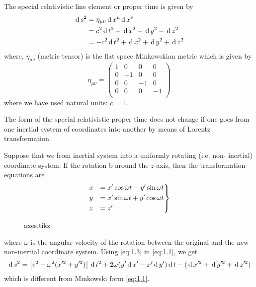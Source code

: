 \documentclass[../main-sheet.tex]{subfiles}
\begin{document}
\begin{soln}
The special relativistic line element or proper time is given by
\begin{align}
    \,\mathrm{d}\, s^2&=\eta_{\mu\nu}\,\mathrm{d}\, x^\mu\,\mathrm{d}\, x^\nu\notag\\
    &=c^2\,\mathrm{d}\, t^2-\,\mathrm{d}\, x^2-\,\mathrm{d}\, y^2-\,\mathrm{d}\, z^2\notag\\
    &=-c^2\,\mathrm{d}\, t^2+\,\mathrm{d}\, x^2+\,\mathrm{d}\, y^2+\,\mathrm{d}\, z^2\label{eq:1.1}
\end{align}
where, \(\eta_{\mu\nu}\) (metric tensor) is the flat space Minkowskian metric which is given by
\begin{equation}
    \eta_{\mu\nu}=\begin{pmatrix}
        1 & 0 & 0 & 0 \\
        0 & -1 & 0 & 0 \\
        0 & 0 & -1 & 0 \\
        0 & 0 & 0 & -1 \\
    \end{pmatrix}
    \label{eq:1.2}
\end{equation}
where we have used natural units: \(c = 1\).


The form of the special relativistic proper time does not change if one goes from one inertial system of coordinates into another by means of Lorentz transformation.


Suppose that we from inertial system into a uniformly rotating (i.e. non- inertial) coordinate system. If the rotation b around the \(z\)-axis, then the
transformation equations are
\begin{equation}
    \begin{rcases}
        x &= x' \cos \omega t - y'\sin \omega t\\
        y &= x' \sin \omega t + y' \cos \omega t\\
        z &= z'
    \end{rcases}\label{eq:1.3}
\end{equation}
\begin{figure}[H]
    \centering
    {axes.tikz}
\end{figure}
where  \(\omega\) is the angular velocity of the rotation between the original and the new non-inertial coordinate system.
Using \eqref{eq:1.3} in \eqref{eq:1.1}, we get
\begin{equation}
    \,\mathrm{d}\, s^2=\left[ c^2-\omega^2(x'^2+y'^2) \right]\,\mathrm{d}\, t^2+2\omega (y'\,\mathrm{d}\, x'-x'\,\mathrm{d}\, y')\,\mathrm{d}\, t-(\,\mathrm{d}\, x'^2+\,\mathrm{d}\, y'^2+\,\mathrm{d}\, z'^2)\label{eq:1.4}
\end{equation}
which is different from Minkowski form \eqref{eq:1.1}.



\end{soln}
\end{document}

